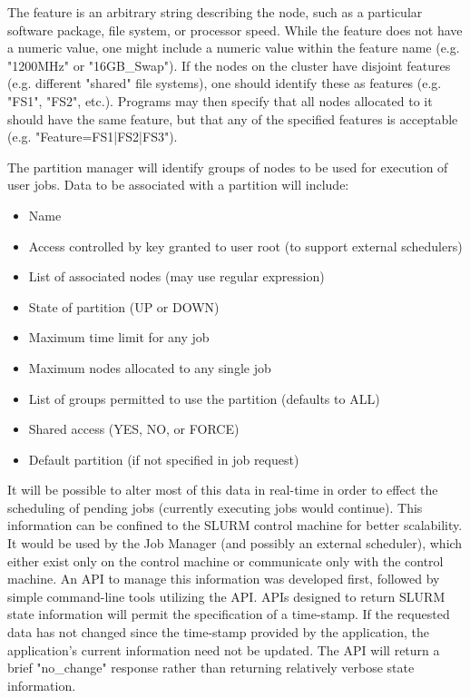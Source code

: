 The feature is an arbitrary string describing the node, such as
a particular software package, file system, or processor speed.
While the feature does not have a numeric value, one might include a
numeric value within the feature name (e.g. "1200MHz" or "16GB\_Swap").
If the nodes on the cluster have disjoint features (e.g. different
"shared" file systems), one should identify these as features (e.g. "FS1",
"FS2", etc.).  Programs may then specify that all nodes allocated to it
should have the same feature, but that any of the specified features is
acceptable (e.g. "Feature=FS1|FS2|FS3").

The partition manager will identify groups of nodes to be used for
execution of user jobs. Data to be associated with a partition will include:
\begin{itemize}
\item Name
\item Access controlled by key granted to user root (to support external schedulers)
\item List of associated nodes (may use regular expression)
\item State of partition (UP or DOWN)
\item Maximum time limit for any job
\item Maximum nodes allocated to any single job
\item List of groups permitted to use the partition (defaults to ALL)
\item Shared access (YES, NO, or FORCE)
\item Default partition (if not specified in job request)
\end{itemize}

It will be possible to alter most of this data in real-time in order
to effect the scheduling of pending jobs (currently executing jobs
would continue).  This information can be confined to the SLURM control
machine for better scalability.  It would be used by the Job Manager
(and possibly an external scheduler), which either exist only on the
control machine or communicate only with the control machine. An API
to manage this information was developed first, followed by simple
command-line tools utilizing the API.  APIs designed to return SLURM
state information will permit the specification of a time-stamp.  If the
requested data has not changed since the time-stamp provided by the
application, the application's current information need not be updated.
The API will return a brief "no\_change" response rather than returning
relatively verbose state information.

